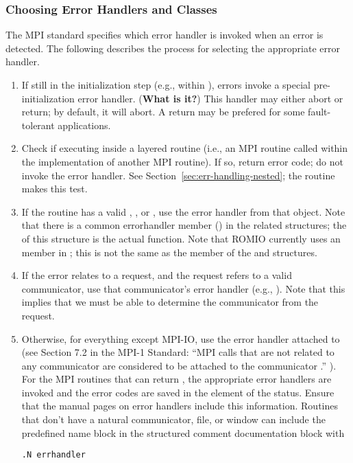 \documentclass{article}
\begin{document}
\subsubsection{Choosing Error Handlers and Classes}
\label{sec:chosing-errhandler}

The MPI standard specifies which error handler is invoked when an error is
detected.  The following describes the process for selecting the appropriate
error handler.

\begin{enumerate}
\item If still in the initialization step (e.g., within
), errors invoke a special pre-initialization error
handler. (\textbf{What is it?})  This handler may either abort or
return; by default, it will abort. 
A return may be prefered for some fault-tolerant applications.

\item Check if executing inside a layered routine (i.e., an MPI routine called
  within the implementation of another MPI routine).  If so, return error
  code; do not invoke the error handler.  See
  Section~\ref{sec:err-handling-nested}; the  routine
  makes this test.

\item If the routine has a valid , , or
  , use the error handler from that object.  Note that there is
  a common errorhandler member () in the related structures;
  the  of this structure is the actual function.
  Note that ROMIO currently uses an  member
  in ; this is not the same as the  member
  of the  and  structures.

\item If the error relates to a request, and the request refers to a valid
  communicator, use that communicator's error handler (e.g., ).
  Note that this implies that we must be able to determine the communicator
  from the request.

\item Otherwise, for everything except MPI-IO, use the error handler attached
  to   
  (see Section 7.2 in the MPI-1 Standard: ``MPI calls that are not related to
  any communicator are considered to be attached to the communicator
  .'' ).  
  For the MPI routines that can return , the
appropriate error handlers are invoked and the error codes are saved
in the  element of the status.
  Ensure that the manual pages on error handlers
  include this information.  Routines that don't have a natural
communicator, file, or window can include the predefined name block
 in the structured comment documentation block with
\begin{verbatim}
.N errhandler
\end{verbatim}


\end{enumerate}
\end{document}
